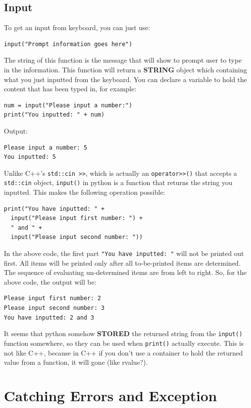 \documentclass[12pt]{book}
\begin{document}
\section{Input}
\label{sec:orged7cce4}
To get an input from keyboard, you can just use:
\begin{verbatim}
input("Prompt information goes here")
\end{verbatim}
The string of this function is the message that will show to prompt user to type in the information. This function will return a \textbf{STRING} object which containing what you just inputted from the keyboard. You can declare a variable to hold the content that has been typed in, for example:
\begin{verbatim}
num = input("Please input a number:")
print("You inputted: " + num)
\end{verbatim}
Output:
\begin{verbatim}
Please input a number: 5
You inputted: 5
\end{verbatim}

Unlike C++'s \texttt{std::cin >>}, which is actually an \texttt{operator>>()} that accepts a \texttt{std::cin} object, \texttt{input()} in python is a function that returns the string you inputted. This makes the following operation possible:
\begin{verbatim}
print("You have inputted: " +
  input("Please input first number: ") +
  " and " +
  input("Please input second number: "))
\end{verbatim}
In the above code, the first part \texttt{"You have inputted: "} will not be printed out first. All items will be printed only after all to-be-printed items are determined. The sequence of evaluating un-determined items are from left to right. So, for the above code, the output will be:
\begin{verbatim}
Please input first number: 2
Please input second number: 3
You have inputted: 2 and 3
\end{verbatim}

It seems that python somehow \textbf{STORED} the returned string from the \texttt{input()} function somewhere, so they can be used when \texttt{print()} actually execute. This is not like C++, because in C++ if you don't use a container to hold the returned value from a function, it will gone (like rvalue?).
\chapter{Catching Errors and Exception}
\label{sec:org0fddff4}
\end{document}
